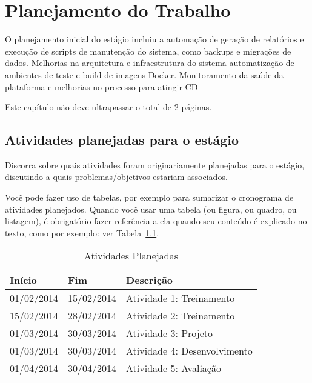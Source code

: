 \chapter{Planejamento do Trabalho}\label{chap:atividadesPlanejadas}

O planejamento inicial do estágio incluiu a automação de geração de relatórios e execução de scripts de manutenção do sistema, como backups e migrações de dados. Melhorias na arquitetura e infraestrutura do sistema automatização de ambientes de teste e build de imagens \gls{Docker}. Monitoramento da saúde da plataforma e melhorias no processo para atingir \gls{CD}

Este capítulo não deve ultrapassar o total de 2 páginas.

\section{Atividades planejadas para o estágio}

Discorra sobre quais atividades foram originariamente planejadas para o estágio, discutindo a quais problemas/objetivos estariam associados.

Você pode fazer uso de tabelas, por exemplo para sumarizar o cronograma de atividades planejados. Quando você usar uma tabela (ou figura, ou quadro, ou listagem), é obrigatório fazer referência a ela quando seu conteúdo é explicado no texto, como por exemplo: ver Tabela~\ref{tab:tab1}.

\begin{table}[h!]
\begin{center}
\caption[Atividades Planejadas]
{Atividades Planejadas}\label{tab:tab1}

\begin{tabular}{llp{7cm}} \hline

\hline
\textbf{Início}    & \textbf{Fim} &  \textbf{Descrição}                             \\
\hline
01/02/2014       & 15/02/2014                & Atividade 1: Treinamento \\
15/02/2014       & 28/02/2014                & Atividade 2: Treinamento\\
01/03/2014       & 30/03/2014                & Atividade 3: Projeto\\
01/03/2014       & 30/03/2014                & Atividade 4: Desenvolvimento\\
01/04/2014       & 30/04/2014                & Atividade 5: Avaliação\\ \hline

\hline
\end{tabular}
\end{center}
\end{table}

